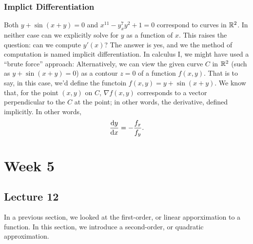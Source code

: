 \documentclass{report}
\begin{document}
\subsection*{Implict Differentiation}
Both $y + \sin(x+y) = 0$ and $x^{11}-y^7_xy^2+1=0$ correspond to curves in $\mathbb{R}^2$. In neither case can we explicitly solve for $y$ as a function of $x$. This raises the question: can we compute $y'(x)$? The answer is yes, and we the method of computation is named implicit differentiation. In calculus I, we might have used a ``brute force'' approach:
Alternatively, we can view the given curve $C$ in $\mathbb{R}^2$ (such as $y + \sin(x+y)=0$) as a contour $z=0$ of a function $f(x,y)$. That is to say, in this case, we'd define the functoin $f(x,y) = y + \sin(x+y)$. We know that, for the point $(x,y)$ on $C$, $\nabla f(x,y)$ corresponds to a vector perpendicular to the $C$ at the point; in other words, the derivative, defined implicitly. In other words,
$$
	\frac{\mathrm{d} y}{\mathrm{d} x} = -\frac{f_x}{f_y}.
$$

\chapter{Week 5}
\section{Lecture 12}
In a previous section, we looked at the first-order, or linear apporximation to a function. In this section, we introduce a second-order, or quadratic approximation.
\end{document}
